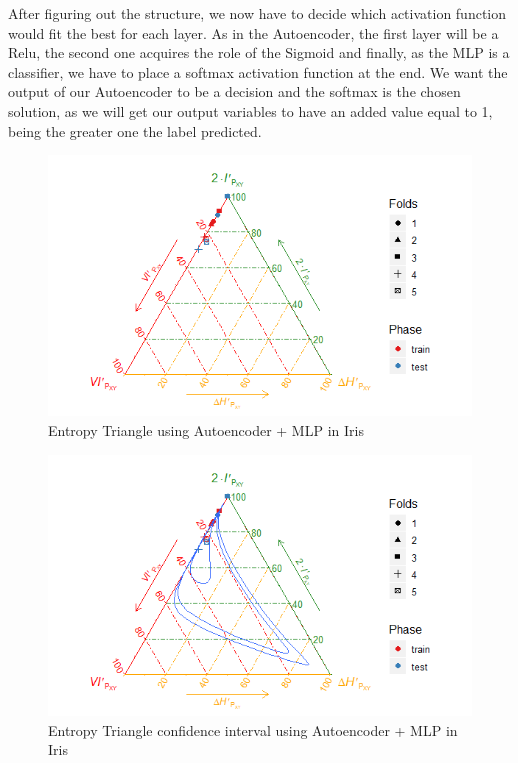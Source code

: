 After figuring out the structure, we now have to decide which activation function would fit the best for each layer. As in the Autoencoder, the first layer will be a Relu, the second one acquires the role of the Sigmoid and finally, as the MLP is a classifier, we have to place a softmax activation function at the end. We want the output of our Autoencoder to be a decision and the softmax is the chosen solution, as we will get our output variables to have an added value equal to 1, being the greater one the label predicted. \par
% 
\begin{figure}[H]
	
	\includegraphics[width=\linewidth]{Figuras_tfg/ET_Iris_Auto_Mlp}
	\caption{Entropy Triangle using Autoencoder + MLP in Iris}
	\label{fig:figure_MLP_Iris_ET_Auto}
\end{figure}

\begin{figure}[H]
	
	\includegraphics[width=\linewidth]{Figuras_tfg/ET_Iris_Auto_Mlp_Confidence}
	\caption{Entropy Triangle confidence interval using Autoencoder + MLP in Iris}
	\label{fig:figure_MLP_Iris_ET_Auto_Confidence}
\end{figure}


